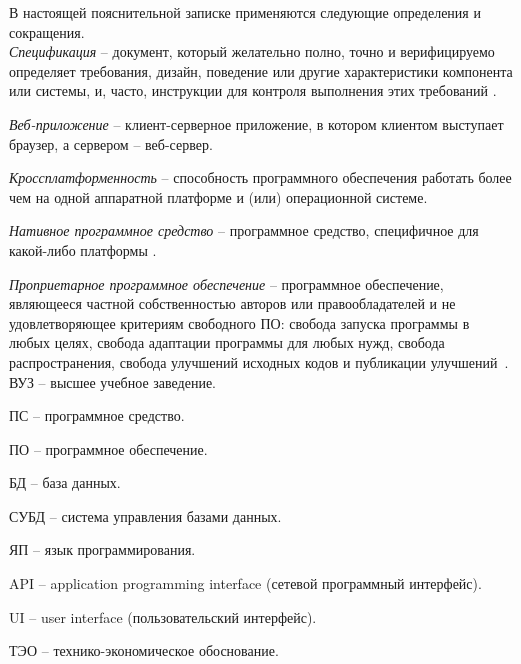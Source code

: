 \label{sec:definitions}

В настоящей пояснительной записке применяются следующие определения и сокращения.
\\

\emph{Спецификация} -- документ, который желательно полно, точно и верифицируемо определяет требования, дизайн, поведение или другие характеристики компонента или системы, и, часто, инструкции для контроля выполнения этих требований \cite{istqb_specification}.

\emph{Веб-приложение} -- клиент-серверное приложение, в котором клиентом выступает браузер, а сервером -- веб-сервер.

\emph{Кроссплатформенность} -- способность программного обеспечения работать более чем на одной аппаратной платформе и (или) операционной системе.

\emph{Нативное программное средство} -- программное средство, специфичное для какой-либо платформы \cite{habr_crossplatform}.

\emph{Проприетарное программное обеспечение} -- программное обеспечение, являющееся частной собственностью авторов или правообладателей и не удовлетворяющее критериям свободного ПО: свобода запуска программы в любых целях, свобода адаптации программы для любых нужд, свобода распространения, свобода улучшений исходных кодов и публикации улучшений~\cite{free_software}.
\\

ВУЗ -- высшее учебное заведение.

ПС -- программное средство.

ПО -- программное обеспечение.

БД -- база данных.

СУБД -- система управления базами данных.

ЯП -- язык программирования.

API -- application programming interface (сетевой программный интерфейс).

UI -- user interface (пользовательский интерфейс).

ТЭО -- технико-экономическое обоснование.
